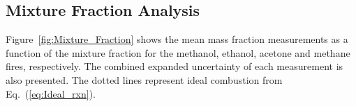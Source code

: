 \documentclass[preprint,review,12pt]{elsarticle}
\begin{document}
\subsection{Mixture Fraction Analysis}
\label{ssec:Mixture_Faction_Analysis}
Figure~\ref{fig:Mixture_Fraction} shows the mean mass fraction measurements as a function of the mixture fraction for the methanol, ethanol, acetone and methane fires, respectively. The combined expanded uncertainty of each measurement is also presented. The dotted lines represent ideal combustion from Eq.~(\ref{eq:Ideal_rxn}). 
\end{document}
